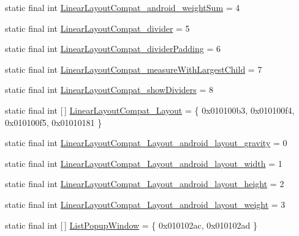 \begin{DoxyCompactItemize}
static final int \mbox{\hyperlink{classandroid_1_1support_1_1design_1_1R_1_1styleable_a318f80ff51afeb9607da24e1f3cd602d}{Linear\+Layout\+Compat\+\_\+android\+\_\+weight\+Sum}} = 4
\item 
static final int \mbox{\hyperlink{classandroid_1_1support_1_1design_1_1R_1_1styleable_ac8f9cf041955a4a03a7828e19e0b5d6d}{Linear\+Layout\+Compat\+\_\+divider}} = 5
\item 
static final int \mbox{\hyperlink{classandroid_1_1support_1_1design_1_1R_1_1styleable_aefe5390da1fa3772f1cabab70d820ada}{Linear\+Layout\+Compat\+\_\+divider\+Padding}} = 6
\item 
static final int \mbox{\hyperlink{classandroid_1_1support_1_1design_1_1R_1_1styleable_ad27424b27e6cc866d087f59f8e75e3d6}{Linear\+Layout\+Compat\+\_\+measure\+With\+Largest\+Child}} = 7
\item 
static final int \mbox{\hyperlink{classandroid_1_1support_1_1design_1_1R_1_1styleable_aef434d8f11ec28d28dd7fe7371c2b39e}{Linear\+Layout\+Compat\+\_\+show\+Dividers}} = 8
\item 
static final int \mbox{[}$\,$\mbox{]} \mbox{\hyperlink{classandroid_1_1support_1_1design_1_1R_1_1styleable_aa15b34677245387b51b9ce8ce236e56a}{Linear\+Layout\+Compat\+\_\+\+Layout}} = \{ 0x010100b3, 0x010100f4, 0x010100f5, 0x01010181 \}
\item 
static final int \mbox{\hyperlink{classandroid_1_1support_1_1design_1_1R_1_1styleable_af6c8c39396ffc7f945642362c1b9f752}{Linear\+Layout\+Compat\+\_\+\+Layout\+\_\+android\+\_\+layout\+\_\+gravity}} = 0
\item 
static final int \mbox{\hyperlink{classandroid_1_1support_1_1design_1_1R_1_1styleable_a7baa6f78e9b97ea62804abb450ea5fdb}{Linear\+Layout\+Compat\+\_\+\+Layout\+\_\+android\+\_\+layout\+\_\+width}} = 1
\item 
static final int \mbox{\hyperlink{classandroid_1_1support_1_1design_1_1R_1_1styleable_a89a3ec25c91803224e2e3de68bda74d3}{Linear\+Layout\+Compat\+\_\+\+Layout\+\_\+android\+\_\+layout\+\_\+height}} = 2
\item 
static final int \mbox{\hyperlink{classandroid_1_1support_1_1design_1_1R_1_1styleable_a9d088a0da6aac134d732ca1683da8969}{Linear\+Layout\+Compat\+\_\+\+Layout\+\_\+android\+\_\+layout\+\_\+weight}} = 3
\item 
static final int \mbox{[}$\,$\mbox{]} \mbox{\hyperlink{classandroid_1_1support_1_1design_1_1R_1_1styleable_a90ef2283a7dff64bc22eed53a9aa1a73}{List\+Popup\+Window}} = \{ 0x010102ac, 0x010102ad \}
\item 

\end{DoxyCompactItemize}
